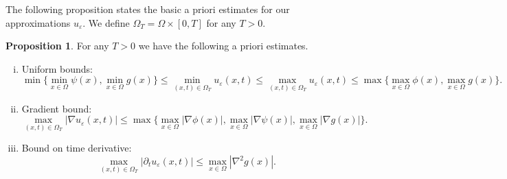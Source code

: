 \documentclass{amsart}
\theoremstyle{definition}
\newtheorem{proposition}[definition]{Proposition}
\begin{document}
The following proposition states the basic a priori estimates for our approximations $u_\varepsilon$. We define $\Omega _T=\Omega \times [0,T]$ for any $T>0$.
\begin{proposition}\label{prop:mp}
For any $T>0$ we have the following a priori estimates.
\begin{enumerate}[(i)]
    \item \label{item:mp1}
    Uniform bounds:
    \[
    \min \{  
    \min_{x \in \Omega} \psi (x), \min_{x \in \Omega } g (x) \}
    \leq
    \min _{(x,t) \in \Omega_T } u_\varepsilon (x,t) \leq 
    \max _{(x,t) \in \Omega_T } u_\varepsilon (x,t)
    \leq \max \{  
    \max_{x \in \Omega} \phi (x), \max_{x \in \Omega } g (x) \}.
    \]
    \item\label{item:mp2}
    Gradient bound:
    \[
    \max _{(x,t) \in \Omega_T } 
    | \nabla u_\varepsilon (x,t)|
    \leq \max \{  
    \max_{x \in \Omega} |\nabla \phi (x)|,
    \max_{x \in \Omega} |\nabla \psi (x)|,    
    \max_{x \in \Omega } |\nabla g (x)| \}.
    \]
    \item\label{item:mp3}
    Bound on time derivative:
    \[
    \max _{(x,t) \in \Omega_T } 
    | \partial_t u_\varepsilon (x,t)|
    \leq
    \max_{x \in \Omega } |\nabla ^2 g (x)|.
    \]
\end{enumerate}

\end{proposition}
\end{document}
